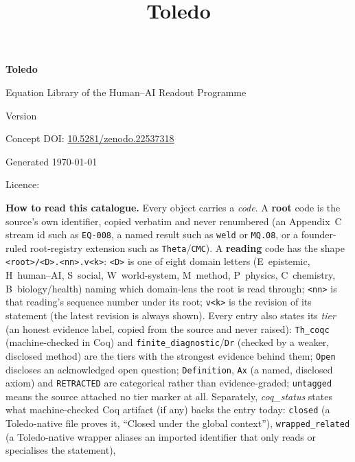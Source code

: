 \documentclass[10pt,a4paper]{article}
\title{Toledo}
\date{}
\author{}
\begin{document}
\begin{titlepage}
\centering
\vspace*{2cm}
{\fontsize{34}{40}\selectfont\bfseries Toledo\par}
\vspace{0.6cm}
{\Large Equation Library of the Human--AI Readout Programme\par}
\vspace{2cm}
{\large Version \ToledoVersion\par}
\vspace{0.4cm}
Concept DOI: \href{https://doi.org/10.5281/zenodo.22537318}{10.5281/zenodo.22537318}\par
\vspace{0.4cm}
Generated \today\par
\vspace{0.4cm}
Licence: \ToledoLicense\par
\vfill
\begin{minipage}{0.86\textwidth}
\small\noindent
\textbf{How to read this catalogue.} Every object carries a \emph{code}. A
\textbf{root} code is the source's own identifier, copied verbatim and never
renumbered (an Appendix~C stream id such as \texttt{EQ-008}, a named result such
as \texttt{weld} or \texttt{MQ.08}, or a founder-ruled root-registry extension such
as \texttt{Theta}/\texttt{CMC}). A \textbf{reading} code has the shape
\texttt{<root>/<D>.<nn>.v<k>}: \texttt{<D>} is one of eight domain letters
(E~epistemic, H~human--AI, S~social, W~world-system, M~method, P~physics,
C~chemistry, B~biology/health) naming which domain-lens the root is read through;
\texttt{<nn>} is that reading's sequence number under its root; \texttt{v<k>} is
the revision of its statement (the latest revision is always shown). Every entry
also states its \emph{tier} (an honest evidence label, copied from the source and
never raised): \texttt{Th\_coqc} (machine-checked in Coq) and
\texttt{finite\_diagnostic}/\texttt{Dr} (checked by a weaker, disclosed method) are
the tiers with the strongest evidence behind them; \texttt{Open} discloses an
acknowledged open question; \texttt{Definition}, \texttt{Ax} (a named, disclosed
axiom) and \texttt{RETRACTED} are categorical rather than evidence-graded;
\texttt{untagged} means the source attached no tier marker at all. Separately,
\emph{coq\_status} states what machine-checked Coq artifact (if any) backs the
entry today: \texttt{closed} (a Toledo-native file proves it, ``Closed under the
global context''), \texttt{wrapped\_related} (a Toledo-native wrapper aliases an
imported identifier that only reads or specialises the statement),

\end{minipage}
\end{titlepage}
\end{document}
